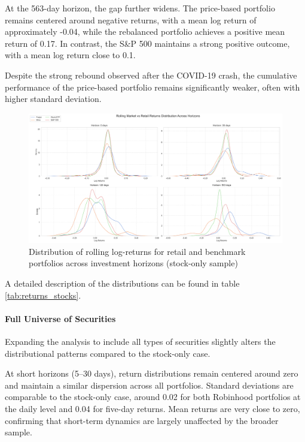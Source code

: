 At the 563-day horizon, the gap further widens. 
The price-based portfolio remains centered around negative returns, with a mean log return of approximately -0.04, while the rebalanced portfolio achieves a positive mean return of 0.17. 
In contrast, the S\&P 500 maintains a strong positive outcome, with a mean log return close to 0.1. 

Despite the strong rebound observed after the COVID-19 crash, the cumulative performance of the price-based portfolio remains significantly weaker, often with higher standard deviation.

\begin{figure}[h!]
    \centering
    \includegraphics[width=1\linewidth]
    {../images/distributions/comparison_1.png}
    \caption{Distribution of rolling log-returns for retail and benchmark portfolios across investment horizons (stock-only sample)}
\end{figure}


A detailed description of the distributions can be found in table \ref{tab:returns_stocks}.

\paragraph{Full Universe of Securities}

Expanding the analysis to include all types of securities slightly alters the distributional patterns compared to the stock-only case.

At short horizons (5–30 days), return distributions remain centered around zero and maintain a similar dispersion across all portfolios. 
Standard deviations are comparable to the stock-only case, around 0.02 for both Robinhood portfolios at the daily level and 0.04 for five-day returns. 
Mean returns are very close to zero, confirming that short-term dynamics are largely unaffected by the broader sample.

